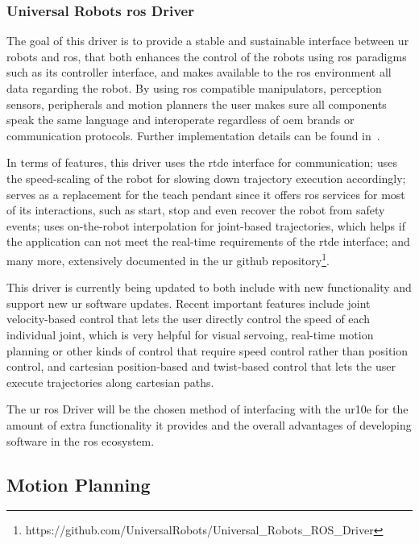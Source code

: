 
\subsubsection{Universal Robots \ac{ros} Driver}

\par The goal of this driver is to provide a stable and sustainable interface between \ac{ur} robots and \ac{ros}, that both enhances the control of the robots using \ac{ros} paradigms such as its controller interface, and makes available to the \ac{ros} environment all data regarding the robot. By using \ac{ros} compatible manipulators, perception sensors, peripherals and motion planners the user makes sure all components speak the same language and interoperate regardless of \acs{oem} brands or communication protocols. Further implementation details can be found in~\cite{ur.ros.driver}.
\par In terms of features, this driver uses the \ac{rtde} interface for communication; uses the speed-scaling of the robot for slowing down trajectory execution accordingly; serves as a replacement for the teach pendant since it offers \ac{ros} services for most of its interactions, such as start, stop and even recover the robot from safety events; uses on-the-robot interpolation for joint-based trajectories, which helps if the application can not meet the real-time requirements of the \ac{rtde} interface; and many more, extensively documented in the \ac{ur} github repository\footnote{https://github.com/UniversalRobots/Universal\_Robots\_ROS\_Driver}.
\par This driver is currently being updated to both include with new functionality and support new \ac{ur} software updates. Recent important features include joint velocity-based control that lets the user directly control the speed of each individual joint, which is very helpful for visual servoing, real-time motion planning or other kinds of control that require speed control rather than position control, and cartesian position-based and twist-based control that lets the user execute trajectories along cartesian paths.
\par The \ac{ur} \ac{ros} Driver will be the chosen method of interfacing with the \ac{ur10e} for the amount of extra functionality it provides and the overall advantages of developing software in the \ac{ros} ecosystem.


\subsection{Motion Planning}

